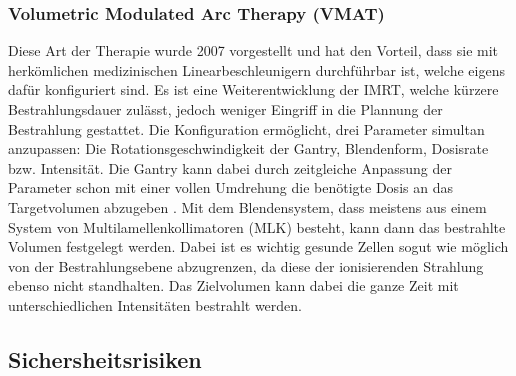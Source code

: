 \subsubsection{Volumetric Modulated Arc Therapy (VMAT)}
Diese Art der Therapie wurde 2007 vorgestellt und hat den Vorteil, dass sie mit herkömlichen medizinischen Linearbeschleunigern durchführbar ist, welche eigens dafür konfiguriert sind.\cite{nicht_so_shady_author}
Es ist eine Weiterentwicklung der IMRT, welche kürzere Bestrahlungsdauer zulässt, jedoch weniger Eingriff in die Plannung der Bestrahlung gestattet.
Die Konfiguration ermöglicht, drei Parameter simultan anzupassen: Die Rotationsgeschwindigkeit der Gantry, Blendenform, Dosisrate bzw. Intensität. 
Die Gantry kann dabei durch zeitgleiche Anpassung der Parameter schon mit einer vollen Umdrehung die benötigte Dosis an das Targetvolumen abzugeben .
Mit dem Blendensystem, dass meistens aus einem System von Multilamellenkollimatoren (MLK) besteht, kann dann das bestrahlte Volumen festgelegt werden.
Dabei ist es wichtig gesunde Zellen sogut wie möglich von der Bestrahlungsebene abzugrenzen, da diese der ionisierenden Strahlung ebenso nicht standhalten.
Das Zielvolumen kann dabei die ganze Zeit mit unterschiedlichen Intensitäten bestrahlt werden.\cite{haha_ka}




\subsection{Sichersheitsrisiken}

